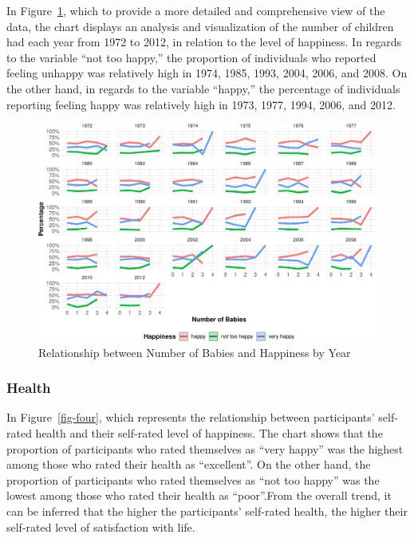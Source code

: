 \documentclass[
  letterpaper,
  DIV=11,
  numbers=noendperiod]{scrartcl}
\begin{document}
In Figure~\ref{fig-three}, which to provide a more detailed and
comprehensive view of the data, the chart displays an analysis and
visualization of the number of children had each year from 1972 to 2012,
in relation to the level of happiness. In regards to the variable ``not
too happy,'' the proportion of individuals who reported feeling unhappy
was relatively high in 1974, 1985, 1993, 2004, 2006, and 2008. On the
other hand, in regards to the variable ``happy,'' the percentage of
individuals reporting feeling happy was relatively high in 1973, 1977,
1994, 2006, and 2012.

\begin{figure}

{\centering \includegraphics{paper_files/figure-pdf/fig-three-1.pdf}

}

\caption{\label{fig-three}Relationship between Number of Babies and
Happiness by Year}

\end{figure}

\hypertarget{health}{%
\subsubsection{Health}\label{health}}

In Figure~\ref{fig-four}, which represents the relationship between
participants' self-rated health and their self-rated level of happiness.
The chart shows that the proportion of participants who rated themselves
as ``very happy'' was the highest among those who rated their health as
``excellent''. On the other hand, the proportion of participants who
rated themselves as ``not too happy'' was the lowest among those who
rated their health as ``poor''.From the overall trend, it can be
inferred that the higher the participants' self-rated health, the higher
their self-rated level of satisfaction with life.
\end{document}
